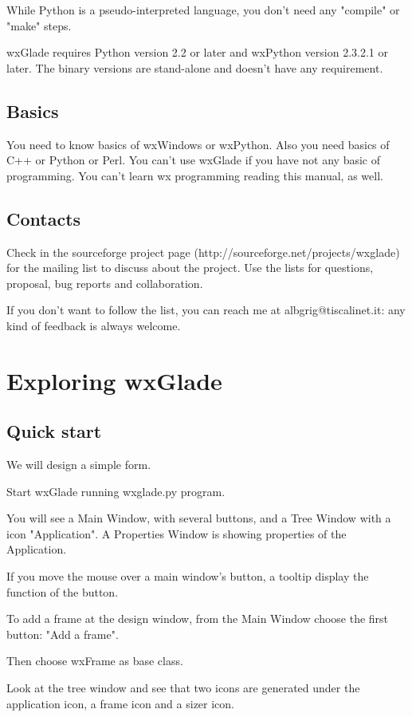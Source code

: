 \documentclass[a4paper,10pt]{report}
\begin{document}
While Python is a pseudo-interpreted language, you don't need
any "compile" or "make" steps.


wxGlade requires Python version 2.2 or later and wxPython version
2.3.2.1 or later.
The binary versions are stand-alone and doesn't have any requirement.
\section{Basics}

You need to know basics of wxWindows or wxPython.
Also you need basics of C++ or Python or Perl.
You can't use wxGlade if you have not any basic of programming.
You can't learn wx programming reading this manual, as well.

\section{Contacts}
Check in the sourceforge project page (http://sourceforge.net/projects/wxglade)
for the mailing list to discuss about the project.
Use the lists for questions, proposal, bug reports and collaboration.

If you don't want to follow the list, you can reach me at albgrig@tiscalinet.it:
any kind of feedback is always welcome.

\chapter{Exploring wxGlade}

\section{Quick start}

We will design a simple form.

Start wxGlade running wxglade.py program.

You will see a Main Window, with several buttons, and a Tree
Window with a icon "Application".  A Properties Window is showing
properties of the Application.


If you move the mouse over a main window's button, a tooltip
display the function of the button.


To add a frame at the design window, from the Main Window choose
the first button: "Add a frame".

Then choose wxFrame as base class.

Look at the tree window and see that two icons are generated
under the application icon, a frame icon and a sizer icon.
\end{document}
